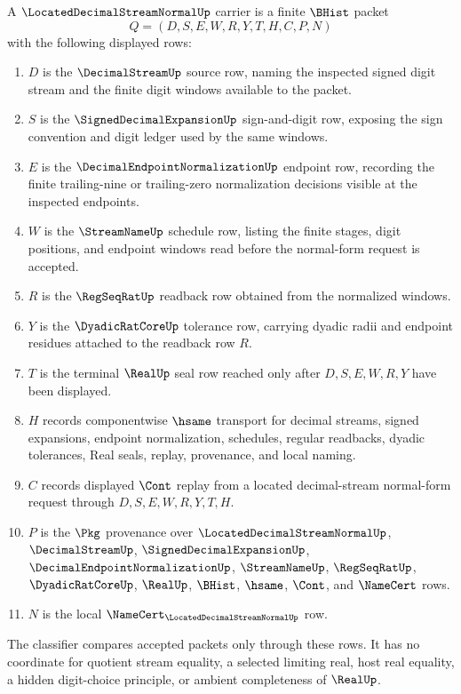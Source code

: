 \begin{definition}
\label{def:located-decimal-stream-normal-carrier}
A $\LocatedDecimalStreamNormalUp$ carrier is a finite $\BHist$ packet
$$
Q=(D,S,E,W,R,Y,T,H,C,P,N)
$$
with the following displayed rows:
\begin{enumerate}
\item $D$ is the $\DecimalStreamUp$ source row, naming the inspected signed digit stream and the finite digit windows available to the packet.
\item $S$ is the $\SignedDecimalExpansionUp$ sign-and-digit row, exposing the sign convention and digit ledger used by the same windows.
\item $E$ is the $\DecimalEndpointNormalizationUp$ endpoint row, recording the finite trailing-nine or trailing-zero normalization decisions visible at the inspected endpoints.
\item $W$ is the $\StreamNameUp$ schedule row, listing the finite stages, digit positions, and endpoint windows read before the normal-form request is accepted.
\item $R$ is the $\RegSeqRatUp$ readback row obtained from the normalized windows.
\item $Y$ is the $\DyadicRatCoreUp$ tolerance row, carrying dyadic radii and endpoint residues attached to the readback row $R$.
\item $T$ is the terminal $\RealUp$ seal row reached only after $D,S,E,W,R,Y$ have been displayed.
\item $H$ records componentwise $\hsame$ transport for decimal streams, signed expansions, endpoint normalization, schedules, regular readbacks, dyadic tolerances, Real seals, replay, provenance, and local naming.
\item $C$ records displayed $\Cont$ replay from a located decimal-stream normal-form request through $D,S,E,W,R,Y,T,H$.
\item $P$ is the $\Pkg$ provenance over $\LocatedDecimalStreamNormalUp$, $\DecimalStreamUp$, $\SignedDecimalExpansionUp$, $\DecimalEndpointNormalizationUp$, $\StreamNameUp$, $\RegSeqRatUp$, $\DyadicRatCoreUp$, $\RealUp$, $\BHist$, $\hsame$, $\Cont$, and $\NameCert$ rows.
\item $N$ is the local $\NameCert_{\LocatedDecimalStreamNormalUp}$ row.
\end{enumerate}
The classifier compares accepted packets only through these rows. It has no coordinate for quotient stream equality, a selected limiting real, host real equality, a hidden digit-choice principle, or ambient completeness of $\RealUp$.
\end{definition}

